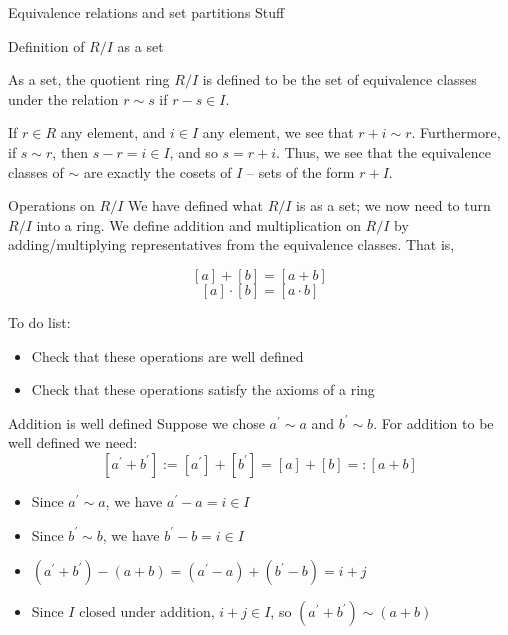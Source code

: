 \documentclass{beamer}
\begin{document}
\begin{frame}{Equivalence relations and set partitions}
Stuff

\end{frame}


\begin{frame}{Definition of $R/I$ as a set}

As a set, the quotient ring $R/I$ is defined to be the set of equivalence classes under the relation $r\sim s$ if $r-s\in I$.

If $r\in R$ any element, and $i\in I$ any element, we see that $r+i\sim r$.  Furthermore, if $s\sim r$, then $s-r=i\in I$, and so $s=r+i$.  Thus, we see that the equivalence classes of $\sim$ are exactly the cosets of $I$ -- sets of the form $r+I$.


\end{frame}


\begin{frame}{Operations on $R/I$}
We have defined what $R/I$ is as a set; we now need to turn $R/I$ into a ring.  We define addition and multiplication on $R/I$ by adding/multiplying representatives from the equivalence classes.  That is, 

$$[a]+[b]=[a+b]$$
$$[a]\cdot [b]=[a\cdot b]$$

\begin{block}{To do list:}
\begin{itemize}
\item Check that these operations are well defined
\item Check that these operations satisfy the axioms of a ring
\end{itemize}
\end{block}

\end{frame}

\begin{frame}{Addition is well defined}
Suppose we chose $a^\prime\sim a$ and $b^\prime \sim b$.  For addition to be well defined we need:
$$[a^\prime+b^\prime]:=[a^\prime]+[b^\prime]=[a]+[b]=:[a+b]$$

\begin{itemize}
\item Since $a^\prime \sim a$, we have $a^\prime-a=i\in I$
\item Since $b^\prime \sim b$, we have $b^\prime-b=i\in I$ 
\item $(a^\prime+b^\prime)-(a+b)=(a^\prime-a)+(b^\prime-b)=i+j$
\item Since $I$ closed under addition, $i+j\in I$, so $(a^\prime+b^\prime)\sim (a+b)$
\end{itemize}

\end{frame}
\end{document}
